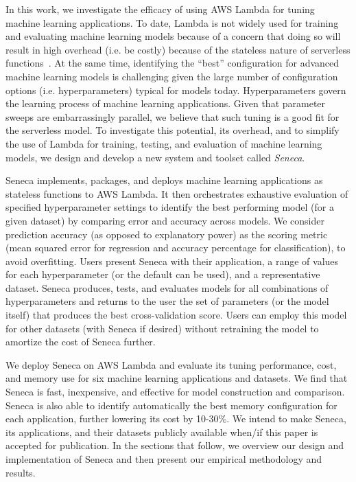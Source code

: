 In this work, we investigate the efficacy of using AWS Lambda
for tuning machine learning applications.
To date, Lambda is not widely used for training and evaluating
machine learning models because of a concern that 
doing so will result in high overhead (i.e. be costly) because
of the stateless nature of serverless functions~\cite{ref:onesteptwostep}.
At the same time, identifying the ``best'' configuration for advanced
machine learning models is challenging given the large number of configuration
options (i.e. hyperparameters) typical for models today.
Hyperparameters govern the learning process of machine learning applications.
Given that parameter sweeps are embarrassingly parallel, we believe
that such tuning is a good fit for the serverless model.
To investigate this potential, its overhead, and to simplify the 
use of Lambda for training, testing, and evaluation of machine learning models, 
we design and develop a new system and toolset called \textit{Seneca}.

Seneca implements, packages, and deploys 
machine learning applications as stateless functions to AWS Lambda.
It then orchestrates exhaustive evaluation of specified hyperparameter settings
to identify the best performing model (for a given dataset) by
comparing error and accuracy across models.  We consider
prediction accuracy (as opposed to explanatory power) as the
scoring metric (mean squared error for regression 
and accuracy percentage for classification), to avoid overfitting.
Users present Seneca with their application, a range of values for 
each hyperparameter (or the default can be used), and a representative dataset.
Seneca produces, tests, and evaluates models for all combinations 
of hyperparameters and returns to the user
the set of parameters (or the model itself) that produces
the best cross-validation score.
Users can employ this model for other datasets
(with Seneca if desired) without retraining the model to amortize the cost
of Seneca further.

We deploy Seneca on AWS Lambda and evaluate its tuning performance, cost,
and memory use for six machine learning applications and datasets. We 
find that Seneca is fast, inexpensive, and effective for model 
construction and comparison. Seneca is also able to identify
automatically the
best memory configuration for each application, further lowering its cost
by 10-30\%.
We intend to make Seneca, its applications, and their datasets publicly available
when/if this paper is accepted for publication.  In the sections
that follow, we overview our design and implementation of Seneca and then
present our empirical methodology and results.


